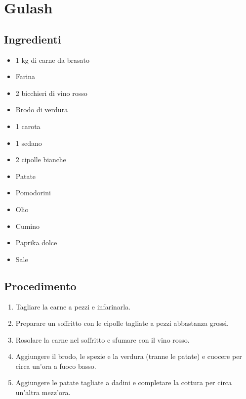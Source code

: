\section{Gulash}
\subsection{Ingredienti}
\begin{itemize}
\item 1 kg di carne da brasato   
\item Farina  
\item 2 bicchieri di vino rosso  
\item Brodo di verdura  
\item 1 carota  
\item 1 sedano  
\item 2 cipolle bianche  
\item Patate  
\item Pomodorini  
\item Olio  
\item Cumino  
\item Paprika dolce  
\item Sale
\end{itemize}
\subsection{Procedimento}
\begin{enumerate}
\item  Tagliare la carne a pezzi e infarinarla.  
\item  Preparare un soffritto con le cipolle tagliate a pezzi abbastanza grossi.  
\item  Rosolare la carne nel soffritto e sfumare con il vino rosso.  
\item  Aggiungere il brodo, le spezie e la verdura (tranne le patate) e cuocere per circa un'ora a fuoco basso.  
\item  Aggiungere le patate tagliate a dadini e completare la cottura per circa un'altra mezz'ora.
\end{enumerate}
